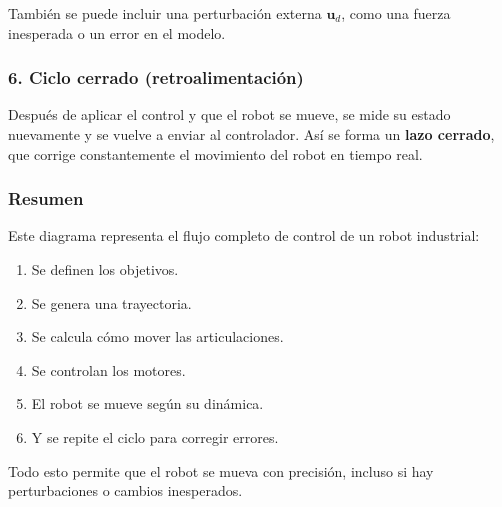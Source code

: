 También se puede incluir una perturbación externa \( \mathbf{u}_d \), como una fuerza inesperada o un error en el modelo.

\subsubsection{6. Ciclo cerrado (retroalimentación)}

Después de aplicar el control y que el robot se mueve, se mide su estado nuevamente y se vuelve a enviar al controlador. Así se forma un \textbf{lazo cerrado}, que corrige constantemente el movimiento del robot en tiempo real.

\subsubsection{Resumen}

Este diagrama representa el flujo completo de control de un robot industrial:
\begin{enumerate}
	\item Se definen los objetivos.
	\item Se genera una trayectoria.
	\item Se calcula cómo mover las articulaciones.
	\item Se controlan los motores.
	\item El robot se mueve según su dinámica.
	\item Y se repite el ciclo para corregir errores.
\end{enumerate}

Todo esto permite que el robot se mueva con precisión, incluso si hay perturbaciones o cambios inesperados.

